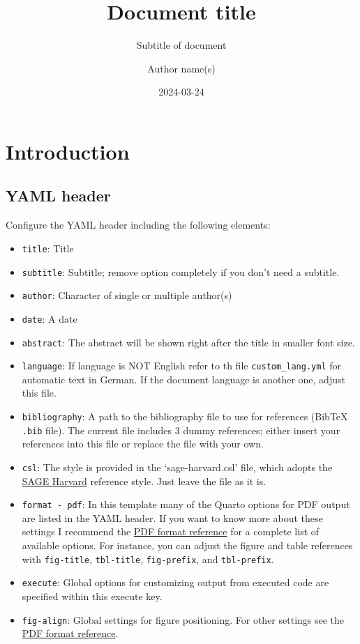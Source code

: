 \documentclass[
  letterpaper,
  DIV=11,
  numbers=noendperiod]{scrartcl}
\title{Document title}
\subtitle{Subtitle of document}
\author{Author name(s)}
\date{2024-03-24}
\providecommand{\tightlist}{%
  \setlength{\itemsep}{0pt}\setlength{\parskip}{0pt}}\usepackage{longtable,booktabs,array}
\begin{document}
\maketitle

\section{Introduction}\label{introduction}

\subsection{YAML header}\label{yaml-header}

Configure the YAML header including the following elements:

\begin{itemize}
\tightlist
\item
  \texttt{title}: Title
\item
  \texttt{subtitle}: Subtitle; remove option completely if you don't
  need a subtitle.
\item
  \texttt{author}: Character of single or multiple author(s)
\item
  \texttt{date}: A date
\item
  \texttt{abstract}: The abstract will be shown right after the title in
  smaller font size.
\item
  \texttt{language}: If language is NOT English refer to th file
  \texttt{custom\_lang.yml} for automatic text in German. If the
  document language is another one, adjust this file.
\item
  \texttt{bibliography}: A path to the bibliography file to use for
  references (BibTeX \texttt{.bib} file). The current file includes 3
  dummy references; either insert your references into this file or
  replace the file with your own.
\item
  \texttt{csl}: The style is provided in the `sage-harvard.csl' file,
  which adopts the
  \href{https://uk.sagepub.com/sites/default/files/sage_harvard_reference_style_0.pdf}{SAGE
  Harvard} reference style. Just leave the file as it is.
\item
  \texttt{format\ -\ pdf}: In this template many of the Quarto options
  for PDF output are listed in the YAML header. If you want to know more
  about these settings I recommend the
  \href{https://quarto.org/docs/reference/formats/pdf.html}{PDF format
  reference} for a complete list of available options. For instance, you
  can adjust the figure and table references with \texttt{fig-title},
  \texttt{tbl-title}, \texttt{fig-prefix}, and \texttt{tbl-prefix}.
\item
  \texttt{execute}: Global options for customizing output from executed
  code are specified within this execute key.
\item
  \texttt{fig-align}: Global settings for figure positioning. For other
  settings see the
  \href{https://quarto.org/docs/reference/formats/pdf.html}{PDF format
  reference}.
\end{itemize}
\end{document}
